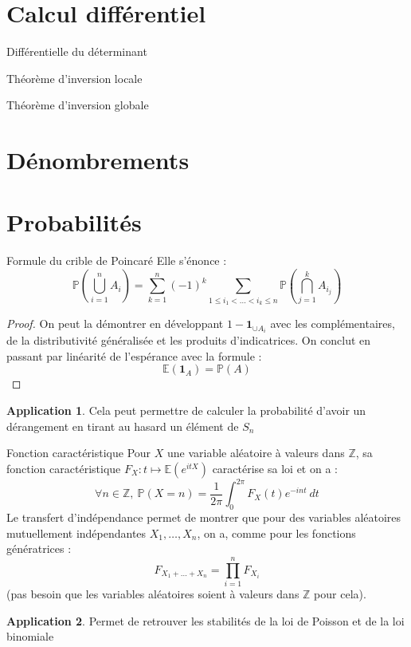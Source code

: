 \documentclass[french]{article}
\renewcommand{\P}{\mathbb{P}}
\newcommand{\Z}{\mathbb{Z}}
\newcommand{\E}{\mathbb{E}}
\theoremstyle{definition}
\newtheorem*{app}{Application}
\begin{document}
\section{Calcul différentiel}

\begin{lem}{Différentielle du déterminant}
\end{lem}

\begin{lem}{Théorème d'inversion locale}
\end{lem}

\begin{lem}{Théorème d'inversion globale}
\end{lem}

\section{Dénombrements}

\section{Probabilités}

\begin{lem}{Formule du crible de Poincaré} Elle s'énonce : $$\P\left(\bigcup_{i=1}^{n}A_i\right)=\sum_{k=1}^{n}(-1)^k\sum_{1\leqslant i_1<\ldots<i_k\leqslant n}\P\left(\bigcap_{j=1}^{k}A_{i_j}\right)$$
\end{lem}
\begin{proof}
	On peut la démontrer en développant $1-\mathbf{1}_{\cup A_i}$ avec les complémentaires, de la distributivité généralisée et les produits d'indicatrices. On conclut en passant par linéarité de l'espérance avec la formule : $$\E(\mathbf{1}_A)=\P(A)$$
\end{proof}
\begin{app} Cela peut permettre de calculer la probabilité d'avoir un dérangement en tirant au hasard un élément de $S_n$
\end{app}

\begin{lem}{Fonction caractéristique} Pour $X$ une variable aléatoire à valeurs dans $\Z$, sa fonction caractéristique $F_X:t\mapsto\E(e^{itX})$ caractérise sa loi et on a : $$\forall n\in\Z,\ \P(X=n)=\frac{1}{2\pi}\int_{0}^{2\pi}F_X(t)e^{-int}\ dt$$ Le transfert d'indépendance permet de montrer que pour des variables aléatoires mutuellement indépendantes $X_1,\ldots,X_n$, on a, comme pour les fonctions génératrices : $$F_{X_1+\ldots+X_n}=\prod_{i=1}^{n}F_{X_i}$$ (pas besoin que les variables aléatoires soient à valeurs dans $\Z$ pour cela).
\end{lem}
\begin{app}
	Permet de retrouver les stabilités de la loi de Poisson et de la loi binomiale
\end{app}
\end{document}
